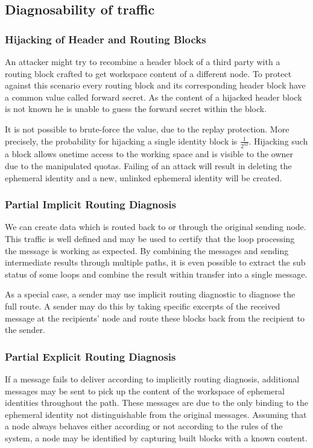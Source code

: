 \subsection{Diagnosability of traffic}

\subsubsection{Hijacking of Header and Routing Blocks}
An attacker might try to recombine a header block of a third party with a routing block crafted to get workspace content of a different node. To protect against this scenario every routing block and its corresponding header block have a common value called forward secret. As the content of a hijacked header block is not known he is unable to guess the forward secret within the block.

It is not possible to brute-force the value, due to the replay protection. More precisely, the probability for hijacking a single identity block is $\frac{1}{2^{32}}$. Hijacking such a block allows onetime access to the working space and is visible to the owner due to the manipulated quotas. Failing of an attack will result in deleting the ephemeral identity and a new, unlinked ephemeral identity will be created. 

\subsubsection{Partial Implicit Routing Diagnosis}
We can create data which is routed back to or through the original sending node. This traffic is well defined and may be used to certify that the loop processing the message is working as expected. By combining the messages and sending intermediate results through multiple paths, it is even possible to extract the sub status of some loops and combine the result within transfer into a single message.

As a special case, a sender may use implicit routing diagnostic to diagnose the full route. A sender may do this by taking specific excerpts of the received message at the recipients' node and route these blocks back from the recipient to the sender. 

\subsubsection{Partial Explicit Routing Diagnosis}
If a message fails to deliver according to implicitly routing diagnosis, additional messages may be sent to pick up the content of the workspace of ephemeral identities throughout the path. These messages are due to the only binding to the ephemeral identity not distinguishable from the original messages. Assuming that a node always behaves either according or not according to the rules of the system, a node may be identified by capturing built blocks with a known content.

